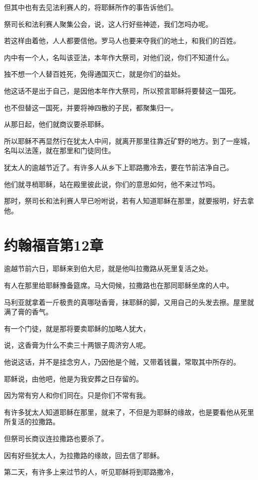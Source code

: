 \documentclass[12pt,oneside]{book}
\begin{document}
但其中也有去见法利赛人的，将耶稣所作的事告诉他们。

祭司长和法利赛人聚集公会，说，这人行好些神迹，我们怎吗办呢。

若这样由着他，人人都要信他。罗马人也要来夺我们的地土，和我们的百姓。

内中有一个人，名叫该亚法，本年作大祭司，对他们说，你们不知道什么。

独不想一个人替百姓死，免得通国灭亡，就是你们的益处。

他这话不是出于自己，是因他本年作大祭司，所以预言耶稣将要替这一国死。

也不但替这一国死，并要将神四散的子民，都聚集归一。

从那日起，他们就商议要杀耶稣。

所以耶稣不再显然行在犹太人中间，就离开那里往靠近矿野的地方。到了一座城，名叫以法莲，就在那里和门徒同住。

犹太人的逾越节近了。有许多人从乡下上耶路撒冷去，要在节前洁净自己。

他们就寻梢耶稣，站在殿里彼此说，你们的意思如何，他不来过节吗。

那时，祭司长和法利赛人早已吩咐说，若有人知道耶稣在那里，就要报明，好去拿他。

\chapter{约翰福音第12章}
逾越节前六日，耶稣来到伯大尼，就是他叫拉撒路从死里复活之处。

有人在那里给耶稣豫备筵席。马大伺候，拉撒路也在那同耶稣坐席的人中。

马利亚就拿着一斤极贵的真哪哒香膏，抹耶稣的脚，又用自己的头发去擦。屋里就满了膏的香气。

有一个门徒，就是那将要卖耶稣的加略人犹大，

说，这香膏为什么不卖三十两银子周济穷人呢。

他说这话，并不是挂念穷人，乃因他是个贼，又带着钱曩，常取其中所存的。

耶稣说，由他吧，他是为我安葬之日存留的。

因为常有穷人和你们同在。只是你们不常有我。

有许多犹太人知道耶稣在那里，就来了，不但是为耶稣的缘故，也是要看他从死里所复活的拉撒路。

但祭司长商议连拉撒路也要杀了。

因有好些犹太人，为拉撒路的缘故，回去信了耶稣。

第二天，有许多上来过节的人，听见耶稣将到耶路撒冷，
\end{document}
